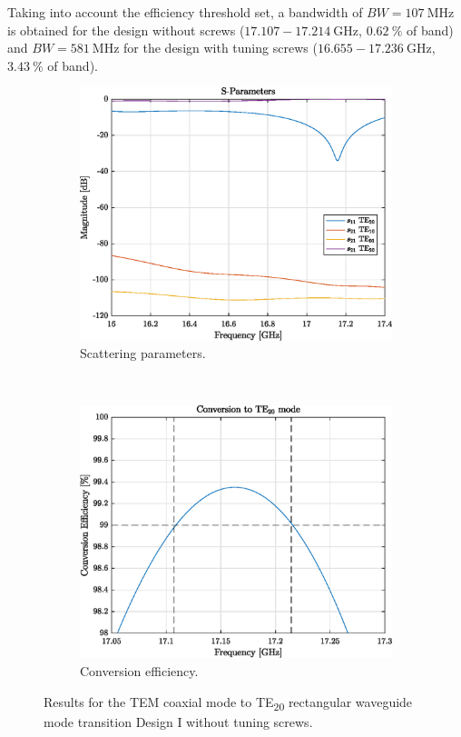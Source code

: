 \documentclass[english,twoside]{article}
\begin{document}
	Taking into account the efficiency threshold set, a bandwidth of $BW=\SI{107}{\mega\hertz}$ is obtained for the design without screws ($\num{17.107}-\SI{17.214}{\giga\hertz}$, $\SI{0.62}{\percent}$ of band) and $BW=\SI{581}{\mega\hertz}$ for the design with tuning screws ($\num{16.655}-\SI{17.236}{\giga\hertz}$, $\SI{3.43}{\percent}$ of band).
	
		\newpage
		\begin{figure}[H]
			\centering
						
			\begin{subfigure}[b]{0.48\textwidth}
				\includegraphics[width=\textwidth]{figures/coaxToWrTE20}
				\caption{Scattering parameters.}
			\end{subfigure}
			~
			\begin{subfigure}[b]{0.48\textwidth}
				\includegraphics[width=\textwidth]{figures/coaxToWrTE20_eff}
				\caption{Conversion efficiency.}
			\end{subfigure}
		
			\caption{Results for the TEM coaxial mode to TE\textsubscript{20} rectangular waveguide mode transition Design I without tuning screws.}
			\label{fig:coaxToWrTE20}
		\end{figure}
	
\end{document}
